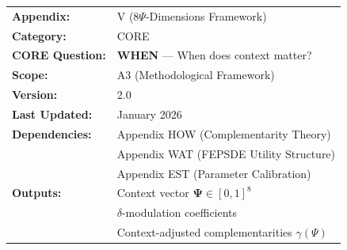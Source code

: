 %
%
%


\begin{tcolorbox}[colback=green!5!white, colframe=green!75!black, 
    title=\textbf{CORE Appendix: Context Assessment}]

\begin{tabular}{@{}ll@{}}
\textbf{Appendix:} & V (8$\Psi$-Dimensions Framework) \\
\textbf{Category:} & CORE \\
\textbf{CORE Question:} & \textbf{WHEN} --- When does context matter? \\
\textbf{Scope:} & A3 (Methodological Framework) \\
\textbf{Version:} & 2.0 \\
\textbf{Last Updated:} & January 2026 \\
\textbf{Dependencies:} & Appendix HOW (Complementarity Theory) \\
 & Appendix WAT (FEPSDE Utility Structure) \\
 & Appendix EST (Parameter Calibration) \\
\textbf{Outputs:} & Context vector $\boldsymbol{\Psi} \in [0,1]^8$ \\
 & $\delta$-modulation coefficients \\
 & Context-adjusted complementarities $\gamma(\Psi)$ \\
\end{tabular}

\end{tcolorbox}


